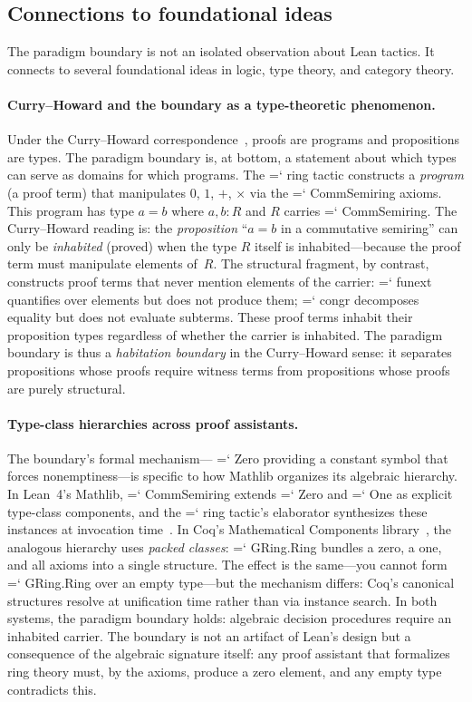 \documentclass[11pt]{article}
\renewcommand{\texttt}[1]{%
  \begingroup\ttfamily\hyphenchar\font=`\-\relax
  \def\_{\textunderscore\discretionary{}{}{}}%
  #1\endgroup}
\theoremstyle{definition}
\theoremstyle{remark}
\begin{document}
\subsection{Connections to foundational ideas}

The paradigm boundary is not an isolated observation about Lean
tactics.  It connects to several foundational ideas in logic,
type theory, and category theory.

\paragraph{Curry--Howard and the boundary as a type-theoretic
phenomenon.}
Under the Curry--Howard
correspondence~\cite{howard1980, curry1958},
proofs are programs and propositions are types.  The paradigm
boundary is, at bottom, a statement about which types can serve as
domains for which programs.  The \texttt{ring} tactic constructs a
\emph{program} (a proof term) that manipulates $0$, $1$, $+$,
$\times$ via the \texttt{CommSemiring} axioms.  This program has
type $a = b$ where $a, b : R$ and $R$ carries \texttt{CommSemiring}.
The Curry--Howard reading is: the \emph{proposition} ``$a = b$ in a
commutative semiring'' can only be \emph{inhabited} (proved) when the
type $R$ itself is inhabited---because the proof term must manipulate
elements of~$R$.  The structural fragment, by contrast, constructs
proof terms that never mention elements of the carrier: \texttt{funext}
quantifies over elements but does not produce them; \texttt{congr}
decomposes equality but does not evaluate subterms.  These proof
terms inhabit their proposition types regardless of whether the
carrier is inhabited.  The paradigm boundary is thus a
\emph{habitation boundary} in the Curry--Howard sense: it separates
propositions whose proofs require witness terms from propositions
whose proofs are purely structural.

\paragraph{Type-class hierarchies across proof assistants.}
The boundary's formal mechanism---\texttt{Zero} providing a
constant symbol that forces nonemptiness---is specific to how
Mathlib organizes its algebraic hierarchy.  In Lean~4's Mathlib,
\texttt{CommSemiring} extends \texttt{Zero} and \texttt{One}
as explicit type-class components, and the \texttt{ring} tactic's
elaborator synthesizes these instances at invocation
time~\cite{mathlib2020, moura2021}.  In
Coq's Mathematical Components library~\cite{mahboubi2013},
the analogous hierarchy uses \emph{packed classes}:
\texttt{GRing.Ring} bundles a zero, a one, and all axioms into a
single structure.  The effect is the same---you cannot form
\texttt{GRing.Ring} over an empty type---but the mechanism differs:
Coq's canonical structures resolve at unification time rather than
via instance search.  In both systems, the paradigm boundary
holds: algebraic decision procedures require an inhabited carrier.
The boundary is not an artifact of Lean's design but a consequence
of the algebraic signature itself: any proof assistant that
formalizes ring theory must, by the axioms, produce a zero element,
and any empty type contradicts this.
\end{document}
